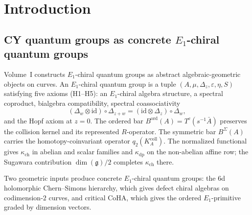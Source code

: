 \documentclass[11pt]{article}
\theoremstyle{plain}
\theoremstyle{definition}
\theoremstyle{remark}
\newcommand{\fg}{\mathfrak{g}}
\newcommand{\bC}{\mathbb{C}}
\newcommand{\Eone}{E_1}
\begin{document}
\begin{abstract}
Wall-crossing in the Bridgeland stability manifold is
Maurer--Cartan gauge equivalence in the convolution algebra of
Volume~I: the Kontsevich--Soibelman wall-crossing formula is the
MC gauge transformation $\Theta_\sigma \sim \Theta_{\sigma'}$.
The shadow obstruction tower at $\kappa_{\mathrm{ch}} = \Psi$
recovers the genus-$1$ constant-map contribution for $\bC^3$; the
all-genus virtual equality is conditional on the uniform-weight
and $\Phi_3^{(\Sigma_2,C)}$ hypotheses, and the motivic equality remains
conjectural in general.
\end{abstract}

\tableofcontents


\section{Introduction}\label{sec:intro}

\subsection{CY quantum groups as concrete $\Eone$-chiral quantum
groups}

Volume~I constructs $\Eone$-chiral quantum groups as abstract
algebraic-geometric objects on curves.  An $\Eone$-chiral quantum
group is a tuple $(A, \mu, \Delta_z, \varepsilon, \eta, S)$
satisfying five axioms (H1--H5): an $\Eone$-chiral algebra
structure, a spectral coproduct, bialgebra compatibility, spectral
coassociativity
\[
 (\Delta_w \otimes \mathrm{id}) \circ \Delta_{z+w}
 = (\mathrm{id} \otimes \Delta_z) \circ \Delta_w,
\]
and the Hopf axiom at $z = 0$.  The ordered bar
$B^{\mathrm{ord}}(A) = T^c(s^{-1}\bar{A})$ preserves the
collision kernel and its represented $R$-operator. The symmetric bar
$B^\Sigma(A)$ carries the homotopy-coinvariant operator
$q_2(K_A^{\mathrm{coll}})$.  The normalized functional gives
$\kappa_{\mathrm{ch}}$ in abelian and scalar families and
$\kappa_{\mathrm{dp}}$ on the non-abelian affine row; the Sugawara
contribution $\dim(\fg)/2$ completes $\kappa_{\mathrm{ch}}$ there.

Two geometric inputs produce concrete $\Eone$-chiral quantum groups:
the $6$d holomorphic Chern--Simons hierarchy, which gives defect
chiral algebras on codimension-$2$ curves, and critical CoHA, which
gives the ordered $\Eone$-primitive graded by dimension vectors.
\end{document}

